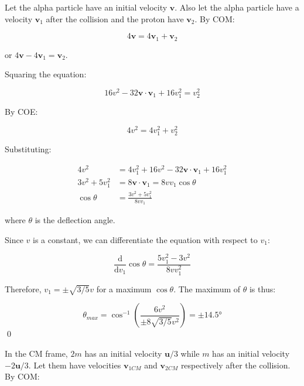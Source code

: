 \documentclass[12pt]{article}
\begin{document}
Let the alpha particle have an initial velocity $\mathbf{v}$. Also let the alpha particle have a velocity $\mathbf{v}_{1}$ after the collision and the proton have $\mathbf{v}_{2}$. By COM:

\begin{equation}
    4\mathbf{v} = 4\mathbf{v}_{1} + \mathbf{v}_{2}
\end{equation}

or $4\mathbf{v} - 4\mathbf{v}_{1} = \mathbf{v}_{2}$.

Squaring the equation:

\begin{equation}
    16 v^{2} - 32 \mathbf{v} \cdot \mathbf{v}_{1} + 16 v_{1}^{2} = v_{2}^{2}
\end{equation}

By COE:

\begin{equation}
    4v^{2} = 4v_{1}^{2} + v_{2}^{2}
\end{equation}

Substituting:

\begin{equation}
\begin{split}
    4v^{2} &= 4v_{1}^{2} + 16v^{2} - 32 \mathbf{v} \cdot \mathbf{v}_{1} + 16v_{1}^{2} \\
    3v^{2} + 5v_{1}^{2} &= 8\mathbf{v} \cdot \mathbf{v}_{1} = 8v v_{1} \cos{\theta} \\
    \cos{\theta} &= \frac{3v^{2} + 5v_{1}^{2}}{8v v_{1}}
\end{split}
\end{equation}

where $\theta$ is the deflection angle.

Since $v$ is a constant, we can differentiate the equation with respect to $v_{1}$:

\begin{equation}
    \frac{\mathrm{d}}{\mathrm{d}v_{1}} \cos{\theta} = \frac{5v_{1}^{2} - 3v^{2}}{8v v_{1}^{2}}
\end{equation}

Therefore, $v_{1} = \pm \sqrt{3/5} v$ for a maximum $\cos{\theta}$. The maximum of $\theta$ is thus:

\begin{equation}
    \theta_{max} = \cos^{-1} \left( \frac{6v^{2}}{\pm 8\sqrt{3/5} v^{2}} \right) = \pm \ang{14.5}
\end{equation}
\qed


In the CM frame, $2m$ has an initial velocity $\mathbf{u}/3$ while $m$ has an initial velocity $-2\mathbf{u}/3$. Let them have velocities $\mathbf{v}_{1CM}$ and $\mathbf{v}_{2CM}$ respectively after the collision. By COM:
\end{document}
